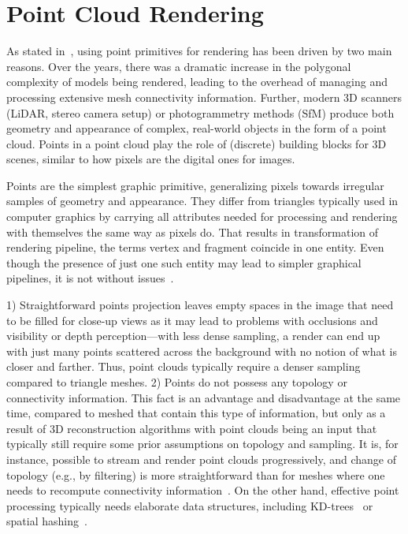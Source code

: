 \chapter{Point Cloud Rendering}

As stated in~\citet{PointRendering}, using point primitives for rendering has been driven
by two main reasons. Over the years,
there was a dramatic increase in the polygonal complexity of models being rendered, leading to
the overhead of managing and processing extensive mesh connectivity information.
Further, modern 3D scanners (LiDAR, stereo camera setup) or photogrammetry methods (SfM) produce
both geometry and appearance of complex, real-world objects in the form of a point cloud. Points in a point cloud
play the role of (discrete) building blocks for 3D scenes, similar to how pixels are the digital ones for images.

Points are the simplest graphic primitive, generalizing pixels towards irregular samples of
geometry and appearance. They differ from triangles typically used in computer graphics
by carrying all attributes needed for processing and rendering with themselves the same way
as pixels do. That results in transformation of rendering pipeline, the terms vertex and fragment coincide in
one entity. Even though the presence of just one such entity may lead to simpler graphical pipelines,
it is not without issues~\citep{ComputeShaderRendering}.

1) Straightforward points projection leaves empty spaces in the image that need to be filled
for close-up views as it may lead to problems with occlusions and visibility or depth perception---with
less dense sampling, a render can end up with just many points scattered across
the background with no notion of what is closer and farther. Thus, point clouds typically
require a denser sampling compared to triangle meshes. 2) Points do not possess any topology or
connectivity information. This fact is an advantage and disadvantage at the same time, compared to
meshed that contain this type of information, but only as a result of 3D reconstruction
algorithms with point clouds being an input that typically still require some prior assumptions on topology
and sampling. It is, for instance, possible to stream and render point clouds progressively, and
change of topology (e.g., by filtering) is more straightforward than for meshes where one needs to recompute
connectivity information~\citep{PointRendering}. On the other hand, effective point processing typically needs
elaborate data structures, including KD-trees~\citep{KDTree} or spatial hashing~\citep{SpatialHashing}.

